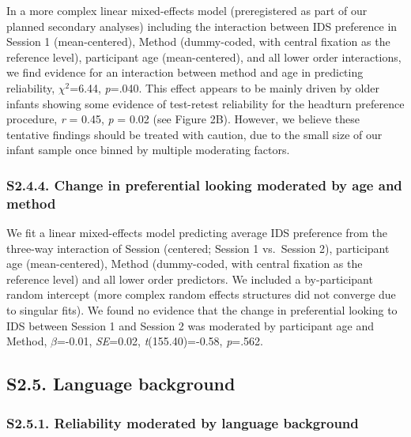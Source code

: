 \documentclass[
  man, donotrepeattitle,floatsintext]{apa6}
\begin{document}
In a more complex linear mixed-effects model (preregistered as part of our planned secondary analyses) including the interaction between IDS preference in Session 1 (mean-centered), Method (dummy-coded, with central fixation as the reference level), participant age (mean-centered), and all lower order interactions, we find evidence for an interaction between method and age in predicting reliability, \({\chi}^2\)=6.44, \emph{p}=.040.
This effect appears to be mainly driven by older infants showing some evidence of test-retest reliability for the headturn preference procedure, \emph{r} = 0.45, \emph{p} = 0.02 (see Figure 2B).
However, we believe these tentative findings should be treated with caution, due to the small size of our infant sample once binned by multiple moderating factors.

\hypertarget{s2.4.4.-change-in-preferential-looking-moderated-by-age-and-method}{%
\subsubsection{S2.4.4. Change in preferential looking moderated by age and method}\label{s2.4.4.-change-in-preferential-looking-moderated-by-age-and-method}}

We fit a linear mixed-effects model predicting average IDS preference from the three-way interaction of Session (centered; Session 1 vs.~Session 2), participant age (mean-centered), Method (dummy-coded, with central fixation as the reference level) and all lower order predictors.
We included a by-participant random intercept (more complex random effects structures did not converge due to singular fits).
We found no evidence that the change in preferential looking to IDS between Session 1 and Session 2 was moderated by participant age and Method, \(\beta\)=-0.01, \emph{SE}=0.02, \emph{t}(155.40)=-0.58, \emph{p}=.562.

\hypertarget{s2.5.-language-background}{%
\subsection{S2.5. Language background}\label{s2.5.-language-background}}

\hypertarget{s2.5.1.-reliability-moderated-by-language-background}{%
\subsubsection{S2.5.1. Reliability moderated by language background}\label{s2.5.1.-reliability-moderated-by-language-background}}
\end{document}
